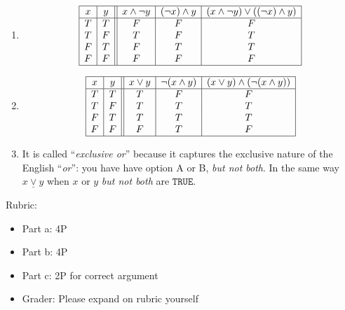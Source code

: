 \documentclass{article}
\theoremstyle{definition}
\newcommand{\xor}{\underline{\lor}}
\begin{document}
\begin{solution}
	\begin{enumerate}
	\item 
	\[\begin{array}{| c | c || c | c | c |}
	\hline
	x & y & x\wedge \neg y & (\neg x)\wedge y & (x \wedge \neg y) \vee ((\neg x) \wedge y)\\
	\hline
		T & T & F & F & F\\
		T & F & T & F & T\\
		F & T & F & T & T\\
		F & F & F & F & F\\
	\hline
	\end{array}\]
	\item 
	\[\begin{array}{| c | c || c | c | c |}
	\hline
	x & y & x\vee y & \neg (x \wedge y) & (x \vee y) \wedge (\neg (x \wedge y))\\
	\hline
		T & T & T & F & F\\
		T & F & T & T & T\\
		F & T & T & T & T\\
		F & F & F & T & F\\
	\hline
	\end{array}\]
	\item It is called ``\textit{exclusive or}'' because it captures the exclusive nature of the English ``\textit{or}'': you have have option A or B, \textit{but not both}. In the same way $x\xor y$ when $x$ or $y$ \textit{but not both} are $\mathtt{TRUE}$.
	\end{enumerate}
{\color{red} Rubric:
\begin{itemize}
\item Part a: 4P
\item Part b: 4P
\item Part c: 2P for correct argument
\item Grader: Please expand on rubric yourself
\end{itemize}}
\end{solution}
\end{document}
